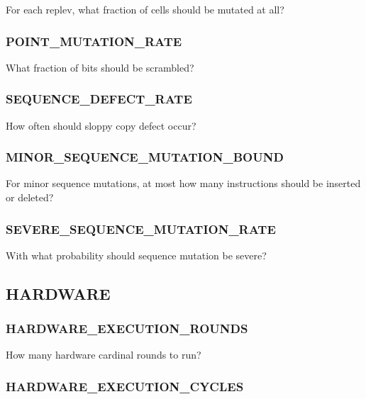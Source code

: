 
For each replev, what fraction of cells should be mutated at all?

\subsubsection{POINT\_MUTATION\_RATE}


What fraction of bits should be scrambled?

\subsubsection{SEQUENCE\_DEFECT\_RATE}


How often should sloppy copy defect occur?

\subsubsection{MINOR\_SEQUENCE\_MUTATION\_BOUND}


For minor sequence mutations, at most how many instructions should be inserted or deleted?

\subsubsection{SEVERE\_SEQUENCE\_MUTATION\_RATE}


With what probability should sequence mutation be severe?

\subsection{HARDWARE}

\subsubsection{HARDWARE\_EXECUTION\_ROUNDS}


How many hardware cardinal rounds to run?

\subsubsection{HARDWARE\_EXECUTION\_CYCLES}

